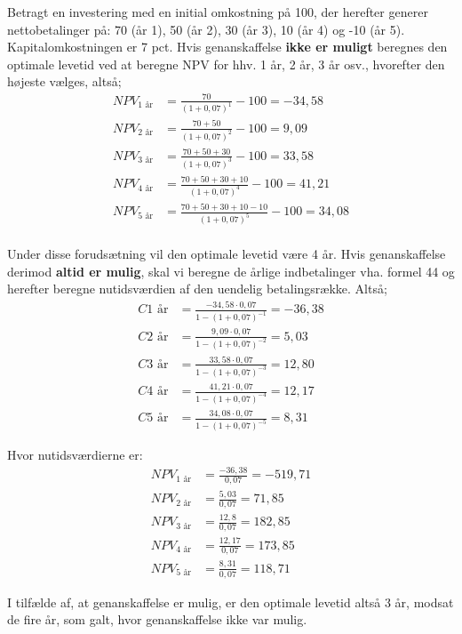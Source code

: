 \documentclass[10pt,reqno, usenames]{article}
\begin{document}
\begin{tcolorbox}[breakable, colback=red!5!white, colframe=red!50!black, title= Eksempel 4: Beregning af optimal levetid for når genanskaffelse er hhv. muligt og ikke muligt]
Betragt en investering med en initial omkostning på 100, der herefter generer nettobetalinger på: 70 (år 1), 50 (år 2), 30 (år 3), 10 (år 4) og -10 (år 5). Kapitalomkostningen er 7 pct. Hvis genanskaffelse \textbf{ikke er muligt} beregnes den optimale levetid ved at beregne NPV for hhv. 1 år, 2 år, 3 år osv., hvorefter den højeste vælges, altså; 
\begin{align*}
NPV_{1 \text{ år}} &= \frac{70}{(1+0,07)^1} - 100 = -34,58 \\
NPV_{2 \text{ år}} &= \frac{70+50}{(1+0,07)^2} - 100 = 9,09 \\
NPV_{3 \text{ år}} &= \frac{70+50+30}{(1+0,07)^3} - 100 = 33,58 \\
NPV_{4 \text{ år}} &= \frac{70+50+30+10}{(1+0,07)^4} - 100 = 41,21 \\
NPV_{5 \text{ år}} &= \frac{70+50+30+10-10}{(1+0,07)^5} - 100 = 34,08 \\
\end{align*}

Under disse forudsætning vil den optimale levetid være 4 år. Hvis genanskaffelse derimod \textbf{altid er mulig}, skal vi beregne de årlige indbetalinger vha. formel 44 og herefter beregne nutidsværdien af den uendelig betalingsrække. Altså; 
\begin{align*}
C{1 \text{ år}}  &= \frac{-34,58 \cdot 0,07}{1-(1+0,07)^{-1}} = -36,38 \\
C{2 \text{ år}} &= \frac{9,09 \cdot 0,07}{1-(1+0,07)^{-2}} = 5,03 \\
C{3 \text{ år}} &= \frac{33,58  \cdot 0,07}{1-(1+0,07)^{-3}} = 12,80\\
C{4 \text{ år}} &= \frac{41,21  \cdot 0,07}{1-(1+0,07)^{-4}} = 12,17 \\
C{5 \text{ år}} &= \frac{34,08  \cdot 0,07}{1-(1+0,07)^{-5}} = 8,31 
\end{align*}

Hvor nutidsværdierne er: 
\begin{align*}
NPV_{1 \text{ år}}  &= \frac{-36,38}{0,07} = -519,71 \\
NPV_{2 \text{ år}}  &= \frac{5,03}{0,07} = 71,85 \\
NPV_{3 \text{ år}} &= \frac{12,8}{0,07} = 182,85 \\
NPV_{4 \text{ år}}  &= \frac{12,17}{0,07} = 173,85 \\
NPV_{5 \text{ år}}  &=  \frac{8,31}{0,07} = 118,71 
\end{align*}

I tilfælde af, at genanskaffelse er mulig, er den optimale levetid altså 3 år, modsat de fire år, som galt, hvor genanskaffelse ikke var mulig.
\end{tcolorbox}
\end{document}
